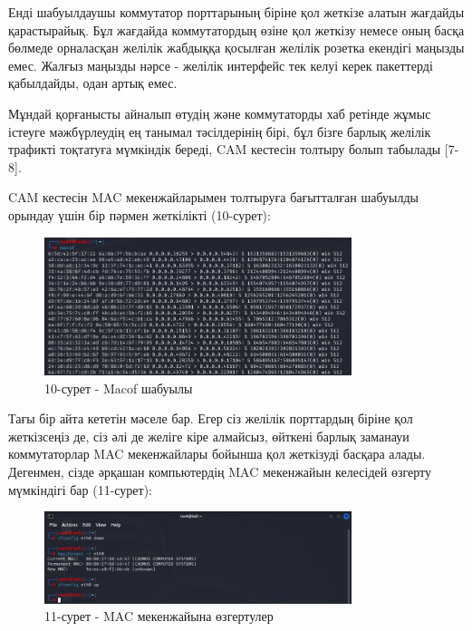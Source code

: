 \begin{multicols}{2}
Енді шабуылдаушы коммутатор порттарының біріне қол жеткізе алатын
жағдайды қарастырайық. Бұл жағдайда коммутатордың өзіне қол жеткізу
немесе оның басқа бөлмеде орналасқан желілік жабдыққа қосылған желілік
розетка екендігі маңызды емес. Жалғыз маңызды нәрсе - желілік интерфейс
тек келуі керек пакеттерді қабылдайды, одан артық емес.

Мұндай қорғанысты айналып өтудің және коммутаторды хаб ретінде жұмыс
істеуге мәжбүрлеудің ең танымал тәсілдерінің бірі, бұл бізге барлық
желілік трафикті тоқтатуға мүмкіндік береді, CAM кестесін толтыру болып
табылады {[}7-8{]}.

CAM кестесін MAC мекенжайларымен толтыруға бағытталған шабуылды орындау
үшін бір пәрмен жеткілікті (10-сурет):
\end{multicols}

\begin{figure}[H]
	\centering
	\includegraphics[width=0.8\textwidth]{assets/34}
	\caption*{10-сурет - Macof шабуылы}
\end{figure}

\begin{multicols}{2}
Тағы бір айта кететін мәселе бар. Егер сіз желілік порттардың біріне қол
жеткізсеңіз де, сіз әлі де желіге кіре алмайсыз, өйткені барлық заманауи
коммутаторлар MAC мекенжайлары бойынша қол жеткізуді басқара алады.
Дегенмен, сізде әрқашан компьютердің MAC мекенжайын келесідей өзгерту
мүмкіндігі бар (11-сурет):
\end{multicols}

\begin{figure}[H]
	\centering
	\includegraphics[width=0.8\textwidth]{assets/35}
	\caption*{11-сурет - MAC мекенжайына өзгертулер}
\end{figure}

